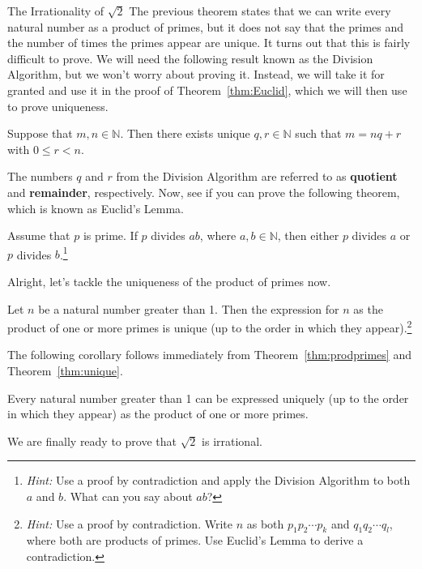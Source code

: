 \begin{section}{The Irrationality of $\sqrt{2}$}
The previous theorem states that we can write every natural number as a product of primes, but it does not say that the primes and the number of times the primes appear are unique.  It turns out that this is fairly difficult to prove.  We will need the following result known as the Division Algorithm, but we won't worry about proving it.  Instead, we will take it for granted and use it in the proof of Theorem~\ref{thm:Euclid}, which we will then use to prove uniqueness.

\begin{theorem}
Suppose that $m,n\in\mathbb{N}$.  Then there exists unique $q,r\in\mathbb{N}$ such that $m=nq+r$ with $0\leq r<n$.
\end{theorem}
The numbers $q$ and $r$ from the Division Algorithm are referred to as \textbf{quotient} and \textbf{remainder}, respectively.  Now, see if you can prove the following theorem, which is known as Euclid's Lemma.

\begin{theorem}\label{thm:Euclid}
Assume that $p$ is prime.  If $p$ divides $ab$, where $a,b\in\mathbb{N}$, then either $p$ divides $a$ or $p$ divides $b$.\footnote{\emph{Hint:} Use a proof by contradiction and apply the Division Algorithm to both $a$ and $b$.  What can you say about $ab$?}
\end{theorem}

Alright, let's tackle the uniqueness of the product of primes now.

\begin{theorem}\label{thm:unique}
Let $n$ be a natural number greater than 1.  Then the expression for $n$ as the product of one or more primes is unique (up to the order in which they appear).\footnote{\emph{Hint:} Use a proof by contradiction.  Write $n$ as both $p_1 p_2 \cdots p_k$ and $q_1 q_2 \cdots q_l$, where both are products of primes.  Use Euclid's Lemma to derive a contradiction.}
\end{theorem}

The following corollary follows immediately from Theorem~\ref{thm:prodprimes} and Theorem~\ref{thm:unique}.

\begin{corollary}\label{cor:FTA}
Every natural number greater than 1 can be expressed uniquely (up to the order in which they appear) as the product of one or more primes.
\end{corollary}

We are finally ready to prove that $\sqrt{2}$ is irrational.


\end{section}
